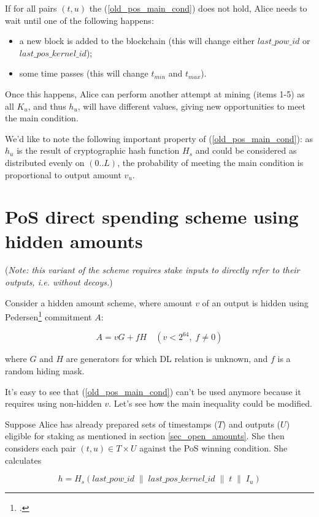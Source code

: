 \documentclass{article}
\numberwithin{figure}{section}
\begin{document}
If for all pairs $(t, u)$ the (\ref{old_pos_main_cond}) does not hold, Alice needs to wait until one of the following happens:
\begin{itemize}
    \item a new block is added to the blockchain (this will change either $last\_pow\_id$ or $last\_pos\_kernel\_id$);
    \item some time passes (this will change $t_{min}$ and $t_{max}$).
\end{itemize}

\indent
Once this happens, Alice can perform another attempt at mining (items 1-5) as all $K_u$, and thus $h_u$, will have different values, giving new opportunities to meet the main condition.


We'd like to note the following important property of (\ref{old_pos_main_cond}): as $h_u$ is the result of cryptographic hash function $H_s$ and could be considered as distributed evenly on $(0..L)$, the probability of meeting the main condition is proportional to output amount $v_u$. 


\section{PoS direct spending scheme using hidden amounts} \label{sec_direct_spend}

\noindent (\textit{Note: this variant of the scheme requires stake inputs to directly refer to their outputs, i.e. without decoys.})

Consider a hidden amount scheme, where amount $v$ of an output is hidden using Pedersen\footcite[More information in original paper by T.P. Pedersen: ][]{Ped} commitment $A$:

\[ A = v G + f H \quad (v < 2^{64}, \; f \neq 0) \]

where $G$ and $H$ are generators for which DL relation is unknown, and $f$ is a random hiding mask.

It's easy to see that (\ref{old_pos_main_cond}) can't be used anymore because it requires using non-hidden $v$. Let's see how the main inequality could be modified.

Suppose Alice has already prepared sets of timestamps ($T$) and outputs ($U$) eligible for staking as mentioned in section \ref{sec_open_amounts}. She then considers each pair $(t, u) \in T \times U$ against the PoS winning condition. She calculates

\[ h = H_s( last\_pow\_id \;\|\; last\_pos\_kernel\_id \;\|\; t \;\|\; I_u ) \]
\end{document}
